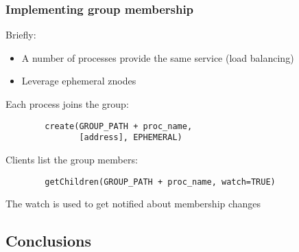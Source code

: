 \documentclass{beamer}
\begin{document}
\begin{frame}[fragile]
	\frametitle{Implementing group membership}
	Briefly:
	\begin{itemize}
		\item A number of processes provide the same service (load balancing)
		\item Leverage ephemeral znodes
	\end{itemize}
	
	\vspace{7pt}
	
	Each process joins the group:
	\begin{verbatim}
		create(GROUP_PATH + proc_name,
		       [address], EPHEMERAL)
	\end{verbatim}

	Clients list the group members:
	\begin{verbatim}
		getChildren(GROUP_PATH + proc_name, watch=TRUE)
	\end{verbatim}
	The watch is used to get notified about membership changes
\end{frame}

\subsection{Conclusions}

\end{document}
